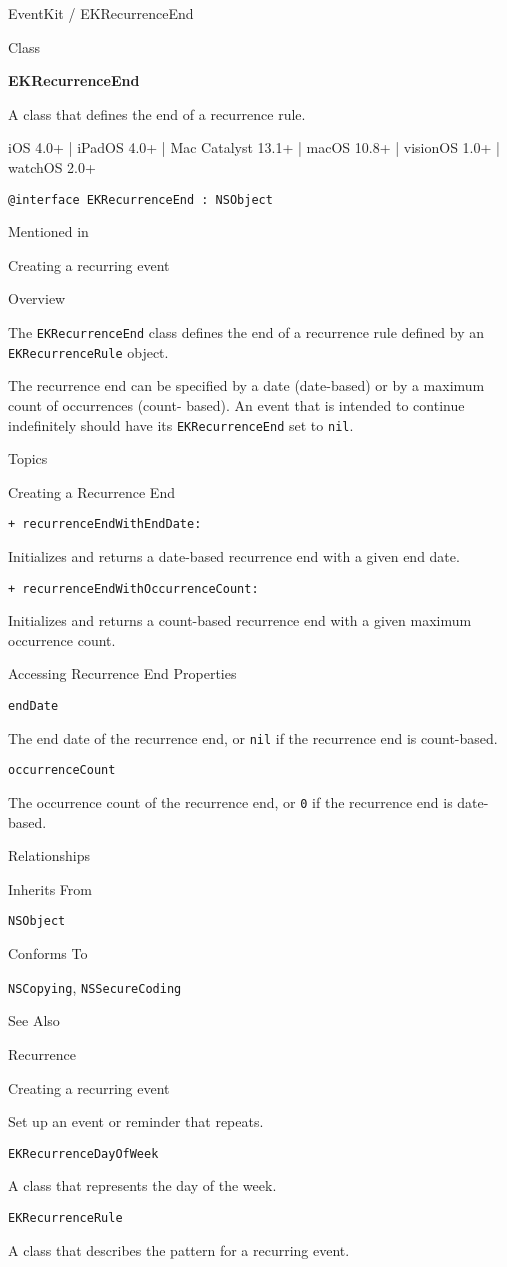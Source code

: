 \documentclass{article}
\title{}
\author{}
\date{}
\begin{document}
EventKit / EKRecurrenceEnd

Class

\textbf{EKRecurrenceEnd}

A class that defines the end of a recurrence rule.

iOS 4.0+ | iPadOS 4.0+ | Mac Catalyst 13.1+ | macOS 10.8+ | visionOS 1.0+ | watchOS 2.0+

\texttt{@interface EKRecurrenceEnd : NSObject}

Mentioned in

Creating a recurring event

Overview

The \texttt{EKRecurrenceEnd} class defines the end of a recurrence rule defined by an \texttt{EKRecurrenceRule} object.

The recurrence end can be specified by a date (date-based) or by a maximum count of occurrences (count- based). An event that is intended to continue indefinitely should have its \texttt{EKRecurrenceEnd} set to \texttt{nil}.

Topics

Creating a Recurrence End

\texttt{+ recurrenceEndWithEndDate:}

Initializes and returns a date-based recurrence end with a given end date.

\texttt{+ recurrenceEndWithOccurrenceCount:}

Initializes and returns a count-based recurrence end with a given maximum occurrence count.

Accessing Recurrence End Properties

\texttt{endDate}

The end date of the recurrence end, or \texttt{nil} if the recurrence end is count-based.

\texttt{occurrenceCount}

The occurrence count of the recurrence end, or \texttt{0} if the recurrence end is date-based.

Relationships

Inherits From

\texttt{NSObject}

Conforms To

\texttt{NSCopying}, \texttt{NSSecureCoding}

See Also

Recurrence

Creating a recurring event

Set up an event or reminder that repeats.

\texttt{EKRecurrenceDayOfWeek}

A class that represents the day of the week.

\texttt{EKRecurrenceRule}

A class that describes the pattern for a recurring event.

\newpage
\end{document}
